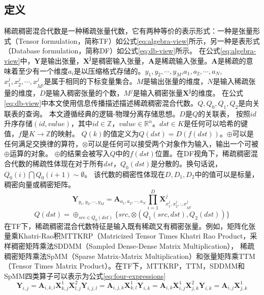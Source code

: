 \subsection{定义}
稀疏稠密混合代数是一种稀疏张量代数，它有两种等价的表示形式：一种是张量形式（Tensor formulation，简称TF）如公式\eqref{eq:algebra-view}所示，另一种是表形式（Database formulation，简称DF）如公式\eqref{eq:db-view}所示。
在公式\eqref{eq:algebra-view}中，$\symbf{Y}$是输出张量，$\symbf{X^j}$是稠密输入张量，$\symbf{A}$是稀疏输入张量。$\symbf{A}$是稀疏的意味着至少有一个维度$a_i$是以压缩格式存储的。$y_1, y_2,\cdots,y_M$,$a_1, a_2,\cdots,a_N$,$x_1^j,x_2^j,\cdots,x_{M^j}^j$是属于相同的下标变量集合。$M$是输出张量的维度，$N$是输入稀疏张量的维度，$D$是输入稠密张量的个数，$M^j$是输入稠密张量$\symbf{X^j}$的维度。
在公式\eqref{eq:db-view}中本文使用信息传播描述描述稀疏稠密混合代数。$Q,Q_0,Q_1,Q_2$是向关联表的查询。
本文遵循经典的逻辑-物理分离存储思想\cite{codd1970relational}。$D$是$Q$的关联表，
按照$id$升序存储$(id, value)$，其中$id\in \mathbb{Z}$，$value \in \mathbb{R}^n$。$dst\in K$是任何可以哈希的键值，$f$是$K\rightarrow \mathbb{Z}$的映射。
$Q(k)$的值定义为$Q(dst)=D(f(dst))$。$\oplus$可以是任何满足交换律的算符，$\otimes$可以是任何可以接受两个对象作为输入，输出一个可被$\oplus$运算的对象。
$\oplus$的结果会被写入$Q$中的$f(dst)$位置。在DF视角下，稀疏稠密混合代数的稀疏性体现在对于所有$dst$，$Q_0(dst)$是分散的。换句话说，$Q_0(i) \bigcap Q_0(i+1) \sim \emptyset $。
该代数的稠密性体现在$D,D_1,D_2$中的值可以是标量，稠密向量或稠密矩阵。
\begin{equation}
  \symbf{Y}_{y_1, y_2,\cdots,y_M} = \symbf{A}_{a_1, a_2,\cdots,a_N}\prod_{i=1}^{D}\symbf{X}^{j}_{x_1^j,x_2^j,\cdot,x_{M^j}^j}
  \label{eq:algebra-view}
\end{equation}
\begin{equation}
  Q(dst)=\oplus_{src\in Q_0(dst)}\{src, \otimes(Q_1(src,dst), Q_2(dst))\}
  \label{eq:db-view}
\end{equation}
在TF下，稀疏稠密混合代数特征是输入既有稀疏又有稠密张量。例如，矩阵化张量乘Khatri-Rao积MTTKRP（Matricized Tensor Times Khatri Rao Product\cite{nisa2019mttkrp}，采样稠密矩阵乘法SDDMM（Sampled Dense-Dense Matrix Multiplication）\cite{yu2021exploiting}，
稀疏稠密矩阵乘法SpMM（Sparse Matrix-Matrix Multiplication）\cite{huang2020ge}和张量矩阵乘TTM（Tensor Times Matrix Product）\cite{kurt2022ttm}。在TF下，MTTKRP，TTM，SDDMM和SpMM四类算子可以表示为公式\eqref{eq:four-expressions}
\begin{subequations}
  \begin{equation}
      \symbf{Y}_{i,j} = \symbf{A}_{i,k,l}\symbf{X}_{k,j}^1\symbf{X}_{l,j}^2
  \end{equation}
  \begin{equation}
      \symbf{Y}_{i,j,l} = \symbf{A}_{i,j,k}\symbf{X}_{k,l}^1
  \end{equation}
  \begin{equation}
      \symbf{Y}_{i,k} = \symbf{A}_{i,k}\symbf{X}_{i,j}^1\symbf{X}_{j,k}^2
  \end{equation}
  \begin{equation}
      \symbf{Y}_{i,k} = \symbf{A}_{i,j}\symbf{X}_{j,k}^1
  \end{equation}
  \label{eq:four-expressions}
\end{subequations}
